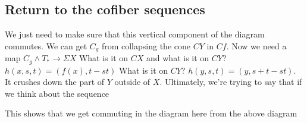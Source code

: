 \documentclass[12pt]{article}
\theoremstyle{definition}
\begin{document}
\subsection{Return to the cofiber sequences}
\begin{center}
	
\end{center} 
We just need to make sure that this vertical component of the diagram commutes. We can get $C_g$ from collapsing the cone $CY$ in $Cf$. Now we need a map $C_g\wedge T_\ast\to \Sigma X$ What is it on $CX$ and what is it on $CY$? $h(x,s,t)=(f(x),t-st)$ What is it on $CY$? $h(y,s,t)=(y,s+t-st)$. It crushes down the part of $Y$ outside of $X$. Ultimately, we're trying to say that if we think about the sequence \begin{center}
\end{center}
This shows that we get commuting in the diagram here from the above diagram
\end{document}
